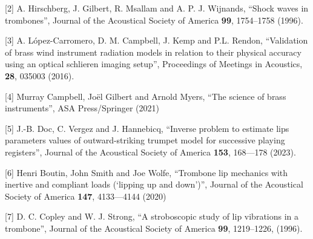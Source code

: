   [2] A. Hirschberg, J. Gilbert, R. Msallam and A. P. J. Wijnands, “Shock waves 
  in trombones”, Journal of the Acoustical Society of America \textbf{99}, 
  1754–1758 (1996). 

  [3] A. López-Carromero, D. M. Campbell, J. Kemp and P.L. Rendon, “Validation 
  of brass wind instrument radiation models in relation to their physical 
  accuracy using an optical schlieren imaging setup”, Proceedings of Meetings 
  in Acoustics, \textbf{28}, 035003 (2016). 

  [4] Murray Campbell, Joël Gilbert and Arnold Myers, “The science of brass 
  instruments”, ASA Press/Springer (2021) 

  [5] J.-B. Doc, C. Vergez and J. Hannebicq, “Inverse problem to estimate lips 
  parameters values of outward-striking trumpet model for successive playing 
  registers”, Journal of the Acoustical Society of America \textbf{153}, 
  168—178 (2023). 

  [6] Henri Boutin, John Smith and Joe Wolfe, “Trombone lip mechanics with 
  inertive and compliant loads (‘lipping up and down’)”, Journal of the 
  Acoustical Society of America \textbf{147}, 4133—4144 (2020) 

  [7] D. C. Copley and W. J. Strong, “A stroboscopic study of lip vibrations in 
  a trombone”, Journal of the Acoustical Society of America \textbf{99}, 
  1219–1226, (1996). 